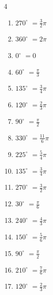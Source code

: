 \begin{multicols}{4}
\begin{enumerate}
  \item $\displaystyle 270^{\circ}$
        $\displaystyle =\frac{3}{2}\pi$

  \item $\displaystyle 360^{\circ}$
        $\displaystyle =2\pi$

  \item $\displaystyle 0^{\circ}$
        $\displaystyle =0$

  \item $\displaystyle 60^{\circ}$
        $\displaystyle =\frac{\pi}{3}$

  \item $\displaystyle 135^{\circ}$
        $\displaystyle =\frac{3}{4}\pi$

  \item $\displaystyle 120^{\circ}$
        $\displaystyle =\frac{2}{3}\pi$

  \item $\displaystyle 90^{\circ}$
        $\displaystyle =\frac{\pi}{2}$

  \item $\displaystyle 330^{\circ}$
        $\displaystyle =\frac{11}{6}\pi$

  \item $\displaystyle 225^{\circ}$
        $\displaystyle =\frac{5}{4}\pi$

  \item $\displaystyle 135^{\circ}$
        $\displaystyle =\frac{3}{4}\pi$

  \item $\displaystyle 270^{\circ}$
        $\displaystyle =\frac{3}{2}\pi$

  \item $\displaystyle 30^{\circ}$
        $\displaystyle =\frac{\pi}{6}$

  \item $\displaystyle 240^{\circ}$
        $\displaystyle =\frac{4}{3}\pi$

  \item $\displaystyle 150^{\circ}$
        $\displaystyle =\frac{5}{6}\pi$

  \item $\displaystyle 90^{\circ}$
        $\displaystyle =\frac{\pi}{2}$

  \item $\displaystyle 210^{\circ}$
        $\displaystyle =\frac{7}{6}\pi$

  \item $\displaystyle 120^{\circ}$
        $\displaystyle =\frac{2}{3}\pi$


\end{enumerate}
\end{multicols}
